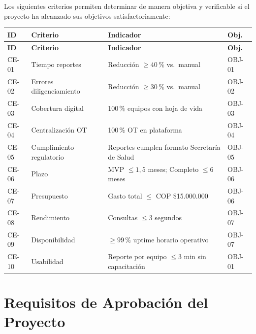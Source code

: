 \documentclass[12pt,a4paper]{article}
\begin{document}
Los siguientes criterios permiten determinar de manera objetiva y verificable si el
proyecto ha alcanzado sus objetivos satisfactoriamente:

\vspace{0.3cm}
\begin{longtable}{|L{1.1cm}|L{3.2cm}|L{4.8cm}|L{1.9cm}|}
\hline
\textbf{ID} & \textbf{Criterio} & \textbf{Indicador} & \textbf{Obj.} \\
\hline
\endfirsthead
\hline
\textbf{ID} & \textbf{Criterio} & \textbf{Indicador} & \textbf{Obj.} \\
\hline
\endhead

CE-01 & Tiempo reportes & Reducción $\geq 40\,\%$ vs.\ manual & OBJ-01 \\
\hline

CE-02 & Errores diligenciamiento & Reducción $\geq 30\,\%$ vs.\ manual & OBJ-02 \\
\hline

CE-03 & Cobertura digital & 100\,\% equipos con hoja de vida & OBJ-03 \\
\hline

CE-04 & Centralización OT & 100\,\% OT en plataforma & OBJ-04 \\
\hline

CE-05 & Cumplimiento regulatorio & Reportes cumplen formato Secretaría de Salud & OBJ-05 \\
\hline

CE-06 & Plazo & MVP $\leq 1{,}5$ meses; Completo $\leq 6$ meses & OBJ-06 \\
\hline

CE-07 & Presupuesto & Gasto total $\leq$ COP \$15.000.000 & OBJ-06 \\
\hline

CE-08 & Rendimiento & Consultas $\leq 3$ segundos & OBJ-07 \\
\hline

CE-09 & Disponibilidad & $\geq 99\,\%$ uptime horario operativo & OBJ-07 \\
\hline

CE-10 & Usabilidad & Reporte por equipo $\leq 3$ min sin capacitación & OBJ-01 \\
\hline

\end{longtable}

\section{Requisitos de Aprobación del Proyecto}
\end{document}
